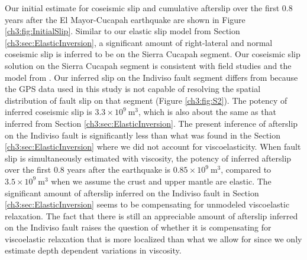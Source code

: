 Our initial estimate for coseismic slip and cumulative afterslip over
the first 0.8 years after the El Mayor-Cucapah earthquake are shown in
Figure \ref{ch3:fig:InitialSlip}.  Similar to our elastic slip model
from Section \ref{ch3:sec:ElasticInversion}, a significant amount of
right-lateral and normal coseismic slip is inferred to be on the
Sierra Cucapah segment. Our coseismic slip solution on the Sierra
Cucapah segment is consistent with field studies \citep{Fletcher2014}
and the model from \citet{Wei2011}.  Our inferred slip on the Indiviso
fault segment differs from \citet{Wei2011} because the GPS data used
in this study is not capable of resolving the spatial distribution of
fault slip on that segment (Figure \ref{ch3:fig:S2}).  The potency of inferred
coseismic slip is $3.3\times 10^{9}\ \mathrm{m}^3$, which is also
about the same as that inferred from Section
\ref{ch3:sec:ElasticInversion}. The present inference of afterslip on
the Indiviso fault is significantly less than what was found in the
Section \ref{ch3:sec:ElasticInversion} where we did not account for
viscoelasticity. When fault slip is simultaneously estimated with
viscosity, the potency of inferred afterslip over the first 0.8 years
after the earthquake is $0.85\times 10^9\ \mathrm{m}^3$, compared to
$3.5\times10^{9}\ \mathrm{m}^3$ when we assume the crust and upper
mantle are elastic.  The significant amount of afterslip inferred on
the Indiviso fault in Section \ref{ch3:sec:ElasticInversion} seems to
be compensating for unmodeled viscoelastic relaxation.  The fact that
there is still an appreciable amount of afterslip inferred on the
Indiviso fault raises the question of whether it is compensating for
viscoelastic relaxation that is more localized than what we allow for
since we only estimate depth dependent variations in viscosity.

